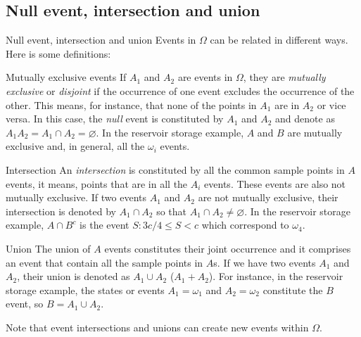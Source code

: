 \documentclass[8pt]{beamer}
\begin{document}
\subsection{Null event, intersection and union}
\begin{frame}{Null event, intersection and union}
    Events in $\Omega$ can be related in different ways. Here is some definitions:
    \begin{block}{Mutually exclusive events}
        If $A_1$ and $A_2$ are events in $\Omega$, they are \emph{mutually exclusive} or \emph{disjoint} if the occurrence of one event excludes the occurrence of the other. This means, for instance, that none of the points in $A_1$ are in $A_2$ or vice versa. In this case, the \emph{null} event is constituted by $A_1$ and $A_2$ and denote as $A_1 A_2 = A_1 \cap A_2 = \varnothing$. In the reservoir storage example, $A$ and $B$ are mutually exclusive and, in general, all the $\omega_i$ events.  
    \end{block}

    \begin{block}{Intersection}
        An \emph{intersection} is constituted by all the common sample points in $A$ events, it means, points that are in all the $A_i$ events. These events are also not mutually exclusive. If two events $A_1$ and $A_2$ are not mutually exclusive, their intersection is denoted by $A_1 \cap A_2$ so that $A_1 \cap A_2 \neq \varnothing$. In the reservoir storage example, $A \cap B^c$ is the event ${S: 3c/4 \leq S < c}$ which correspond to $\omega_4$. 
    \end{block}

    \begin{block}{Union}
        The union of $A$ events constitutes their joint occurrence and it comprises an event that contain all the sample points in $A$s. If we have two events $A_1$ and $A_2$, their union is denoted as $A_1 \cup A_2$ ($A_1 + A_2$). For instance, in the reservoir storage example, the states or events $A_1 = \omega_1$ and $A_2 = \omega_2$ constitute the $B$ event, so $B = A_1 \cup A_2$.
    \end{block}
    Note that event intersections and unions can create new events within $\Omega$. 
\end{frame}
\end{document}
